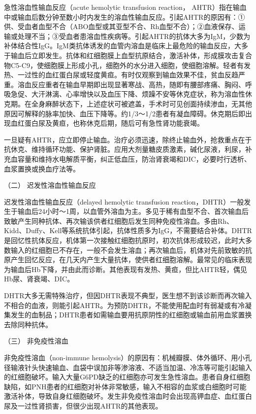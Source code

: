 急性溶血性输血反应（acute hemolytic transfusion reaction，
AHTR）指在输血中或输血后数分钟至数小时内发生的溶血性输血反应。引起AHTR的原因有：①供、受血者血型不合（ABO血型或其亚型不合、Rh血型不合）；②血液保存、运输或处理不当；③受血者患溶血性疾病等。引起AHTR的抗体大多为IgM，少数为补体结合性IgG。IgM类抗体诱发的血管内溶血是临床上最危险的输血反应，大多于输血后立即发生。抗体和红细胞膜上血型抗原结合，激活补体，形成膜攻击复合物C5-C9，使细胞膜上形成小孔，细胞外的水分进入细胞，使细胞溶解。轻者有发热、一过性的血红蛋白尿或轻度黄疸。有时仅观察到输血效果不佳，贫血反趋严重。溶血反应重者在输血早期即出现显著寒战、高热，随即有腰部疼痛、胸闷、呼吸急促、大汗淋漓、心率增快以及血压下降、烦躁不安等休克症状，称为溶血性休克期。在全身麻醉状态下，上述症状可被遮盖，手术时可见创面持续渗血，无其他原因可解释的脉率加快、血压下降等。约1/3～1/2患者有凝血障碍。休克期后即出现血红蛋白尿及黄疸，也称休克后期，随后可有急性肾功能衰竭。

一旦疑有AHTR，应立即停止输血。治疗必须迅速，除终止输血外，抢救重点在于抗休克、维持循环功能、保护肾脏。应用大剂量糖皮质激素，碱化尿液，利尿，补充血容量和维持水电解质平衡，纠正低血压，防治肾衰竭和DIC，必要时行透析、血浆置换或换血疗法等。

\hypertarget{text00397.htmlux5cux23CHP16-12-2-1-2}{}
（二） 迟发性溶血性输血反应

迟发性溶血性输血反应（delayed hemolytic transfusion
reaction，DHTR）一般发生于输血后24小时～1周，以血管外溶血为主。多见于稀有血型不合、首次输血后致敏产生同种抗体、再次输该供者红细胞后发生同种免疫性溶血。多由Rh、Kidd、Duffy、Kell等系统抗体引起，抗体性质多为IgG，不需要结合补体。DHTR是回忆性抗体反应，机体第一次接触红细胞抗原时，初次抗体形成较迟，此时大多数输入的红细胞已不存在，一般不会发生溶血；再次输血后，机体对先前致敏的抗原产生回忆反应，在几天内产生大量抗体，使供者红细胞溶解。最常见的临床表现为输血后Hb下降，并由此而诊断。其他表现有发热、黄疸，但比AHTR轻，偶见Hb尿、肾衰竭、DIC。

DHTR大多无需特殊治疗，但因DHTR表现不典型，医生想不到该诊断而再次输入不相合的血液，则能引起AHTR。为预防DHTR，不能使用配血时有弱凝或有冷凝集发生的血制品；DHTR患者如需输血要用抗原阴性的红细胞或输血前用血浆置换去除同种抗体。

\hypertarget{text00397.htmlux5cux23CHP16-12-2-1-3}{}
（三） 非免疫性溶血

非免疫性溶血（non-immune
hemolysis）的原因有：机械瓣膜、体外循环、用小孔径输液针头快速输血、血袋中误加非等渗溶液、不适当加温、冷冻等可能引起输入的红细胞破坏。输入大量G6PD缺乏的红细胞亦可发生急性溶血。患者自身红细胞缺陷，如PNH患者的红细胞对补体非常敏感，输入不相容的血浆或白细胞时可能激活补体，导致自身红细胞破坏。发生非免疫性溶血时会出现高钾血症、血红蛋白尿及一过性肾损害，但很少出现AHTR的其他表现。

